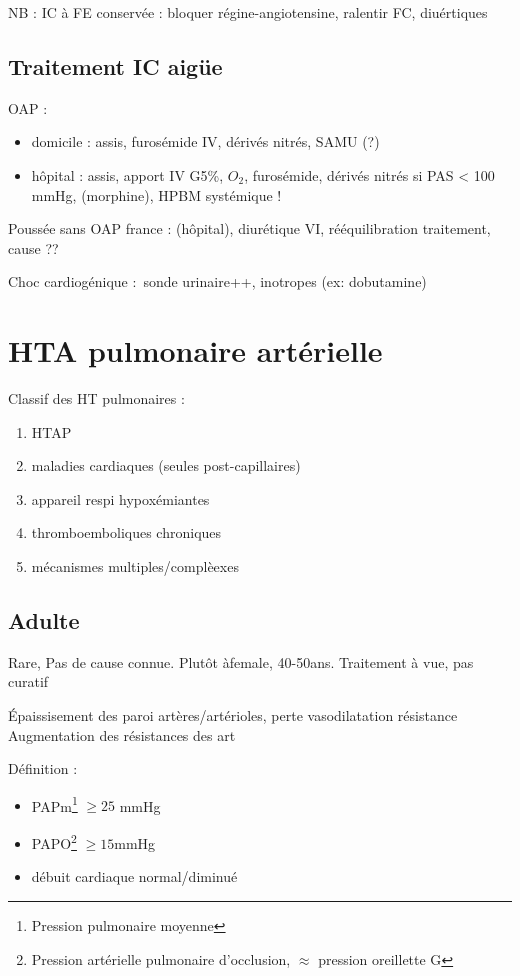 NB : IC à FE conservée : bloquer régine-angiotensine, ralentir FC, diuértiques

\subsection{Traitement IC aigüe}
OAP : 
\begin{itemize}
  \item domicile : assis, furosémide IV, dérivés nitrés, SAMU (?)
  \item hôpital : assis, apport IV G5\%, $O_2$, furosémide, dérivés nitrés si
    PAS < 100 mmHg, (morphine), HPBM systémique !
\end{itemize}
Poussée sans OAP france : (hôpital), diurétique VI, rééquilibration traitement,
cause ??

Choc cardiogénique : sonde urinaire++, inotropes (ex: dobutamine)

\section{HTA pulmonaire artérielle}%
\label{sec:hta_pulmonaire_arterielle}

Classif des HT pulmonaires : 
\begin{enumerate}
  \item HTAP
  \item maladies cardiaques (seules post-capillaires)
  \item appareil respi \lor{} hypoxémiantes
  \item thromboemboliques chroniques
  \item mécanismes multiples/complèexes
\end{enumerate}
\subsection{Adulte}
Rare, Pas de cause connue. Plutôt àfemale, 40-50ans. Traitement à vue, pas curatif

Épaissisement des paroi artères/artérioles, perte vasodilatation \thus \inc résistance
Augmentation des résistances des art

Définition : 
\begin{itemize}
  \item PAPm\footnote{Pression pulmonaire moyenne} $\ge 25$ mmHg 
  \item PAPO\footnote{Pression artérielle pulmonaire d'occlusion, $\approx$ pression
oreillette G} $\ge 15$mmHg
\item débuit cardiaque normal/diminué
\end{itemize}

